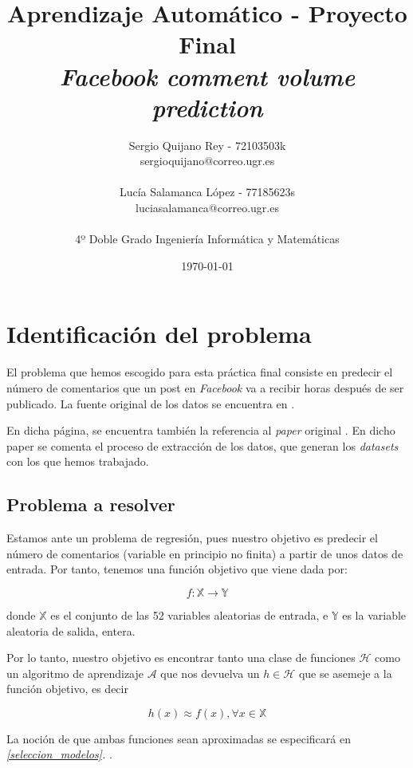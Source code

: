 \documentclass[11pt]{article}
\title{
    {Aprendizaje Automático - Proyecto Final}\\
    {\emph{Facebook comment volume prediction}}
}
\author{
    {Sergio Quijano Rey - 72103503k}\\
    {sergioquijano@correo.ugr.es} \\
    {} \\
    {Lucía Salamanca López - 77185623s} \\
    {luciasalamanca@correo.ugr.es}\\
    {} \\
    {4º Doble Grado Ingeniería Informática y Matemáticas}
}
\date{\today}
\begin{document}
\maketitle
\pagebreak

\tableofcontents

\listoffigures

\listoftables

\pagebreak

\section{Identificación del problema}

El problema que hemos escogido para esta práctica final consiste en predecir el número de comentarios que un post en \emph{Facebook} va a recibir horas después de ser publicado. La fuente original de los datos se encuentra en \cite{uci:online}.

En dicha página, se encuentra también la referencia al \emph{paper} original \cite{original_paper:paper}. En dicho paper se comenta el proceso de extracción de los datos, que generan los \emph{datasets} con los que hemos trabajado.

\subsection{Problema a resolver}

Estamos ante un problema de regresión, pues nuestro objetivo es predecir el número de comentarios (variable en principio no finita) a partir de unos datos de entrada. Por tanto, tenemos una función objetivo que viene dada por:

$$f: \mathbb{X} \rightarrow \mathbb{Y}$$

donde $\mathbb{X}$ es el conjunto de las 52 variables aleatorias de entrada, e $\mathbb{Y}$ es la variable aleatoria de salida, entera.

Por lo tanto, nuestro objetivo es encontrar tanto una clase de funciones $\mathcal{H}$ como un algoritmo de aprendizaje $\mathcal{A}$ que nos devuelva un $h \in \mathcal{H}$ que se asemeje a la función objetivo, es decir

$$h(x) \approx f(x), \forall x \in \mathbb{X}$$

La noción de que ambas funciones sean aproximadas se especificará en \emph{\ref{seleccion_modelos}. }.
\end{document}
